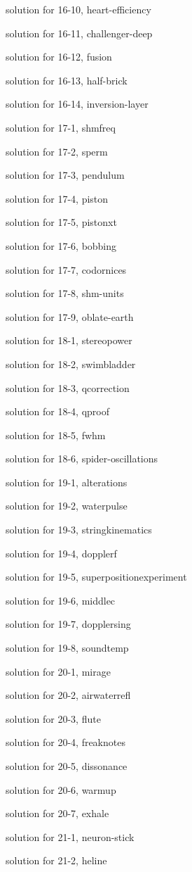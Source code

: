 \documentclass{problems}
\begin{document}
solution for 16-10, heart-efficiency

solution for 16-11, challenger-deep

solution for 16-12, fusion

solution for 16-13, half-brick

solution for 16-14, inversion-layer

solution for 17-1, shmfreq

solution for 17-2, sperm

solution for 17-3, pendulum

solution for 17-4, piston

solution for 17-5, pistonxt

solution for 17-6, bobbing

solution for 17-7, codornices

solution for 17-8, shm-units

solution for 17-9, oblate-earth

solution for 18-1, stereopower

solution for 18-2, swimbladder

solution for 18-3, qcorrection

solution for 18-4, qproof

solution for 18-5, fwhm

solution for 18-6, spider-oscillations

solution for 19-1, alterations

solution for 19-2, waterpulse

solution for 19-3, stringkinematics

solution for 19-4, dopplerf

solution for 19-5, superpositionexperiment

solution for 19-6, middlec

solution for 19-7, dopplersing

solution for 19-8, soundtemp

solution for 20-1, mirage

solution for 20-2, airwaterrefl

solution for 20-3, flute

solution for 20-4, freaknotes

solution for 20-5, dissonance

solution for 20-6, warmup

solution for 20-7, exhale

solution for 21-1, neuron-stick

solution for 21-2, heline
\end{document}
